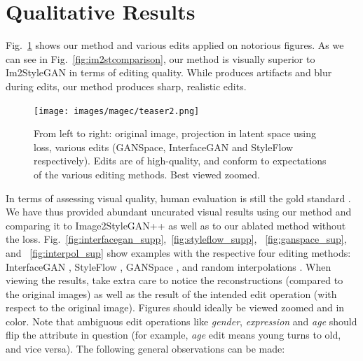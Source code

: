 



\section{Qualitative Results} 
Fig.~\ref{fig:teaser} shows our method and various 
edits applied on notorious figures. As we can see in Fig.~\ref{fig:im2stcomparison}, 
our method is visually  superior to Im2StyleGAN \citep{abdal2020} in terms of 
editing quality. While \cite{abdal2020} produces artifacts and blur during edits, our
 method produces sharp, realistic edits.

 \begin{figure}
  \centering
    \texttt{[image: images/magec/teaser2.png]}
    \caption{From left to right: original image, projection in latent space using \magec loss, various edits (GANSpace, InterfaceGAN and StyleFlow respectively). Edits are of high-quality, and conform to expectations of the various editing methods. Best viewed zoomed.}
    \label{fig:teaser}
\end{figure}
 


In terms of assessing visual quality, human evaluation is still
 the gold standard \citep{hype, e4e}. We have thus provided 
 abundant uncurated visual results using our method and comparing
  it to Image2StyleGAN++ \citep{abdal2020} as well as to our 
  ablated method without the \magec loss. 
Fig.~\ref{fig:interfacegan_supp},~\ref{fig:styleflow_supp}, 
~\ref{fig:ganspace_sup}, and ~\ref{fig:interpol_sup} show examples with the 
respective four editing methods: InterfaceGAN \citep{shen2020}, StyleFlow
 \citep{abdal2020styleflow}, GANSpace \citep{harkonen2020ganspace}, and 
 random interpolations \citep{karra2019stylegan}. When viewing the results, 
 take extra care to notice the reconstructions (compared to the original images) as 
 well as the result of the intended edit operation (with respect to the original 
 image). Figures should ideally be viewed zoomed and in color. Note that ambiguous
  edit operations like  \emph{gender}, \emph{expression} and \emph{age} should flip
   the attribute in question (for example, \emph{age} edit means young turns to old,
    and vice versa).  The following general observations can be made:

